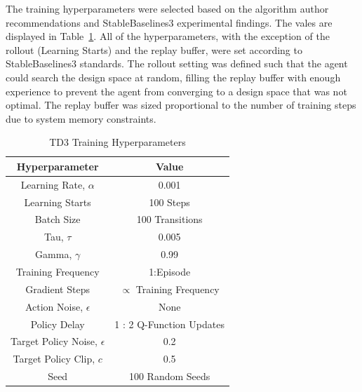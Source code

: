 \documentclass[10pt,twocolumn,letterpaper]{article}
\begin{document}
The training hyperparameters were selected based on the algorithm author recommendations and StableBaselines3 experimental findings. The vales are displayed in Table~\ref{tab:training_hyperameters}. All of the hyperparameters, with the exception of the rollout (Learning Starts) and the replay buffer, were set according to StableBaselines3 standards. The rollout setting was defined such that the agent could search the design space at random, filling the replay buffer with enough experience to prevent the agent from converging to a design space that was not optimal. The replay buffer was sized proportional to the number of training steps due to system memory constraints.  
%
\begin{table}[t]
        \caption{TD3 Training Hyperparameters}
        \vspace{-4mm}
        \label{tab:training_hyperameters}
        \begin{center}
        \begin{tabular}{|c||c|}
        \hline
        Hyperparameter                     & Value                           \\
        \hline
        Learning Rate, $\alpha$         & 0.001                           \\
        Learning Starts                 & 100 Steps                       \\
        Batch Size                      & 100 Transitions                 \\
        Tau, $\tau$                     & 0.005                           \\
        Gamma, $\gamma$                 & 0.99                            \\
        Training Frequency              & 1:Episode                       \\
        Gradient Steps                  & $\propto$ Training Frequency    \\
        Action Noise,  $\epsilon$       & None                            \\
        Policy Delay                    & 1 : 2 Q-Function Updates        \\
        Target Policy Noise, $\epsilon$ & 0.2                             \\
        Target Policy Clip, $c$         & 0.5                             \\
        Seed                            & 100 Random Seeds                \\
        \hline
        \end{tabular}
        \end{center}
        \vspace{-5mm}
\end{table}
\end{document}
